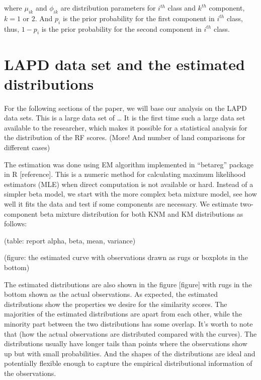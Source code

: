 \documentclass[]{elsarticle} %
\begin{document}
where \(\mu_{ik}\) and \(\phi_{ik}\) are distribution parameters for
\(i^{th}\) class and \(k^{th}\) component, \(k = 1\) or \(2\). And
\(p_i\) is the prior probability for the first component in \(i^{th}\)
class, thus, \(1-p_i\) is the prior probability for the second component
in \(i^{th}\) class.

\hypertarget{lapd-data-set-and-the-estimated-distributions}{%
\section{LAPD data set and the estimated
distributions}\label{lapd-data-set-and-the-estimated-distributions}}

For the following sections of the paper, we will base our analysis on
the LAPD data sets. This is a large data set of \ldots{} It is the first
time such a large data set available to the researcher, which makes it
possible for a statistical analysis for the distribution of the RF
scores. (More! And number of land comparisons for different cases)

The estimation was done using EM algorithm implemented in ``betareg''
package in R {[}reference{]}. This is a numeric method for calculating
maximum likelihood estimators (MLE) when direct computation is not
available or hard. Instead of a simpler beta model, we start with the
more complex beta mixture model, see how well it fits the data and test
if some components are necessary. We estimate two-component beta mixture
distribution for both KNM and KM distributions as follows:

(table: report alpha, beta, mean, variance)

(figure: the estimated curve with observations drawn as rugs or boxplots
in the bottom)

The estimated distributions are also shown in the figure {[}figure{]}
with rugs in the bottom shown as the actual observations. As expected,
the estimated distributions show the properties we desire for the
similarity scores. The majorities of the estimated distributions are
apart from each other, while the minority part between the two
distributions has some overlap. It's worth to note that (how the actual
observations are distributed compared with the curves). The
distributions usually have longer tails than points where the
observations show up but with small probabilities. And the shapes of the
distributions are ideal and potentially flexible enough to capture the
empirical distributional information of the observations.
\end{document}
